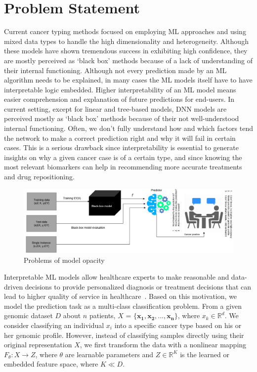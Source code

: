 \section{Problem Statement} \label{problem_challenges}
Current cancer typing methods focused on employing ML approaches and using mixed data types to handle the high dimensionality and heterogeneity. Although these models have shown tremendous success in exhibiting high confidence, they are mostly perceived as `black box' methods because of a lack of understanding of their internal functioning. Although not every prediction made by an ML algorithm needs to be explained, in many cases the ML models itself have to have interpretable logic embedded. Higher interpretability of an ML model means easier comprehension and explanation of future predictions for end-users. In current setting, except for linear and tree-based models, DNN models are perceived mostly as `black box' methods because of their not well-understood internal functioning. Often, we don't fully understand how and which factors tend the network to make a correct prediction right and why it will fail in certain cases. This is a serious drawback since interpretability is essential to generate insights on why a given cancer case is of a certain type, and since knowing the most relevant biomarkers can help in recommending more accurate treatments and drug repositioning. 

\begin{figure}[h]
	\centering
	\includegraphics[width=0.9\linewidth]{images/bbm.png}
	\caption{Problems of model opacity}
    \label{fig:model_bbm}
    \vspace{-2mm}
\end{figure}

\hspace*{3.5mm} Interpretable ML models allow healthcare experts to make reasonable and data-driven decisions to provide personalized diagnosis or treatment decisions that can lead to higher quality of service in healthcare~\cite{stiglic2020interpretability}. Based on this motivation, we model the prediction task as a multi-class classification problem. From a given genomic dataset $D$ about $n$ patients, $X$ = ${\mathbf{\{x_1,x_2,..., x_n}}\}$, where $x_k \in \mathbb{R}^{d}$. We consider classifying an individual $x_i$ into a specific cancer type based on his or her genomic profile. However, instead of classifying samples directly using their original representation $X$, we first transform the data with a nonlinear mapping $F_{\theta}: X \rightarrow Z$, where $\theta$ are learnable parameters and $Z \in \mathbb{R}^{K}$ is the learned or embedded feature space, where $K \ll D$.

